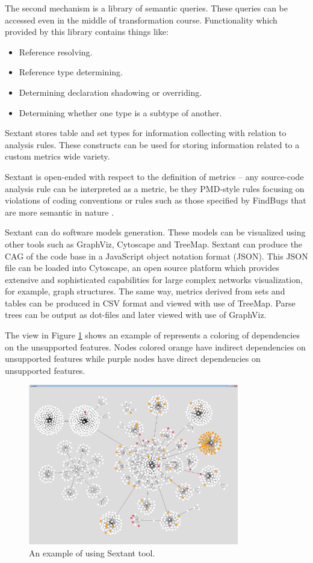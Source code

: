 The second mechanism is a library of semantic queries. These queries can be accessed even in the middle of transformation course. Functionality which provided by this library contains things like:
\begin{itemize}
	\item Reference resolving.
	\item Reference type determining.
	\item Determining declaration shadowing or overriding.
	\item Determining whether one type is a subtype of another.
\end{itemize}
 
Sextant stores table and set types for information collecting with relation to analysis rules. These constructs can be used for storing information related to a custom metrics wide variety.

Sextant is open-ended with respect to the definition of metrics – any source-code analysis rule can be interpreted as a metric, be they PMD-style rules focusing on violations of coding conventions or rules such as those specified by FindBugs that are more semantic in nature \cite{sextant}.

Sextant can do software models generation. These models can be visualized using other tools such as GraphViz, Cytoscape and TreeMap. Sextant can produce the CAG of the code base in a JavaScript object notation format (JSON). This JSON file can be loaded into Cytoscape, an open source platform which provides extensive and sophisticated capabilities for large complex networks visualization, for example, graph structures. The same way, metrics derived from sets and tables can be produced in CSV format and viewed with use of TreeMap. Parse trees can be output as dot-files and later viewed with use of GraphViz.

The view in Figure \ref{fig:1} shows an example of represents a coloring of dependencies on the unsupported features. Nodes colored orange have indirect dependencies on unsupported features while purple nodes have direct dependencies on unsupported features.

\begin{figure}[ht]
	\centering
	\includegraphics[height=70mm]{figures/1.png}
	\caption{An example of using Sextant tool.}
	\label{fig:1}
\end{figure}

